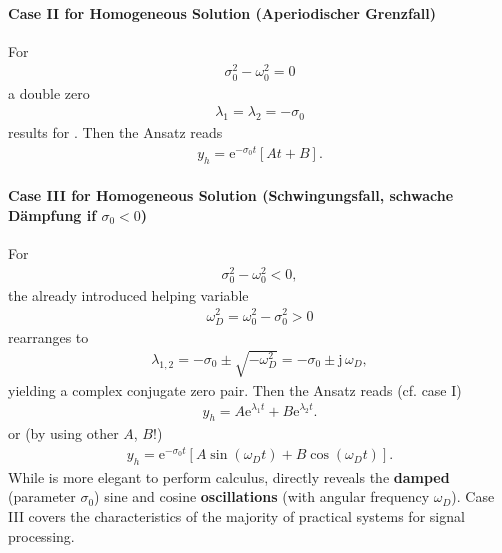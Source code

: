 \paragraph{Case II for Homogeneous Solution (Aperiodischer Grenzfall)}
For
\begin{align}
\sigma_0^2 - \omega_0^2 = 0
\end{align}
a double zero
\begin{align}
\lambda_{1} = \lambda_{2} = -\sigma_0
\end{align}
results for .
Then the Ansatz reads
\begin{align}
y_h = \mathrm{e}^{-\sigma_0 t} [A t + B].
\end{align}

\paragraph{Case III for Homogeneous Solution (Schwingungsfall,
schwache Dämpfung if $\sigma_0<0$)}
\label{pg:caseIII}
For
\begin{align}
\sigma_0^2 - \omega_0^2 < 0,
\end{align}
the already introduced helping variable
\begin{align}
\omega_D^2 = \omega_0^2 - \sigma_0^2 > 0
\end{align}
rearranges  to
\begin{align}
\label{eq:lmb12_caseIII}
\lambda_{1,2} = -\sigma_0 \pm \sqrt{-\omega_D^2}
= -\sigma_0 \pm \mathrm{j}\,\omega_D,
\end{align}
yielding a complex conjugate zero pair.
Then the Ansatz reads (cf. case I)
\begin{align}
\label{eq:Ansatz_caseIIIkomplex}
\boxed{
y_h = A \mathrm{e}^{\lambda_1 t} + B \mathrm{e}^{\lambda_2 t}.
}
\end{align}
or (by using other $A$, $B$!)
\begin{align}
\label{eq:Ansatz_caseIIIsincos}
y_h = \mathrm{e}^{-\sigma_0 t}
\left[ A \sin(\omega_D t) + B \cos(\omega_D t)\right].
\end{align}
While  is more elegant to perform calculus,
 directly reveals the \textbf{damped}
(parameter $\sigma_0$) sine and cosine \textbf{oscillations}
(with angular frequency $\omega_D$).
%
Case III covers the characteristics of the majority of practical systems
for signal processing.



